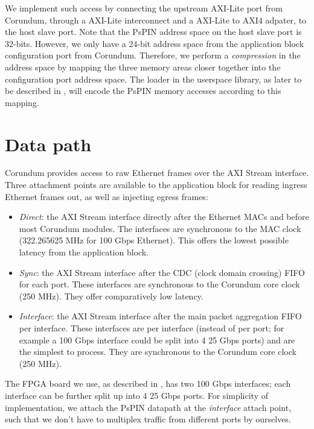 We implement such access by connecting the upstream AXI-Lite port from Corundum, through a AXI-Lite interconnect and a AXI-Lite to AXI4 adpater, to the host slave port.  Note that the PsPIN address space on the host slave port is 32-bits.  However, we only have a 24-bit address space from the application block configuration port from Corundum.  Therefore, we perform a \emph{compression} in the address space by mapping the three memory areas closer together into the configuration port address space.  The loader in the userspace library, as later to be described in , will encode the PsPIN memory accesses according to this mapping.

\section{Data path}

Corundum provides access to raw Ethernet frames over the AXI Stream interface.  Three attachment points are available to the application block for reading ingress Ethernet frames out, as well as injecting egress frames:

\begin{itemize}
    \item \emph{Direct}: the AXI Stream interface directly after the Ethernet MACs and before most Corundum modules.  The interfaces are synchronous to the MAC clock (322.265625 MHz for 100 Gbps Ethernet).  This offers the lowest possible latency from the application block.
    \item \emph{Sync}: the AXI Stream interface after the CDC (clock domain crossing) FIFO for each port.  These interfaces are synchronous to the Corundum core clock (250 MHz).  They offer comparatively low latency.
    \item \emph{Interface}: the AXI Stream interface after the main packet aggregation FIFO per interface.  These interfaces are per interface (instead of per port; for example a 100 Gbps interface could be split into 4 25 Gbps ports) and are the simplest to process.  They are synchronous to the Corundum core clock (250 MHz).
\end{itemize}

The FPGA board we use, as described in , has two 100 Gbps interfaces; each interface can be further split up into 4 25 Gbps ports.  For simplicity of implementation, we attach the PsPIN datapath at the \emph{interface} attach point, such that we don't have to multiplex traffic from different ports by ourselves.

